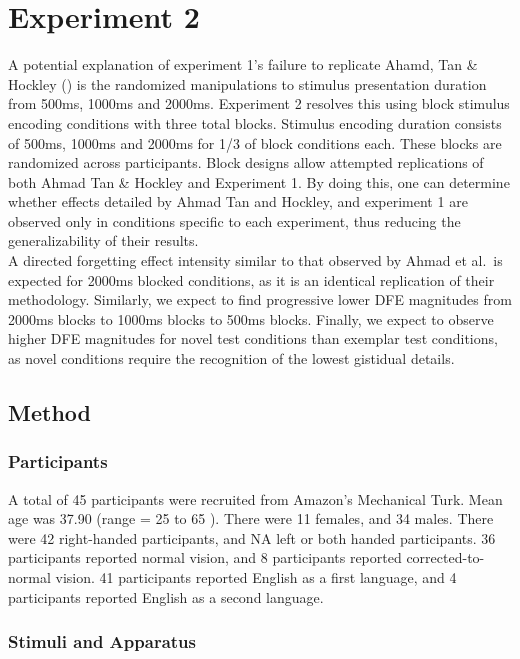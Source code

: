 \documentclass[
  english,
  man,floatsintext]{apa6}
\begin{document}
\hypertarget{experiment-2}{%
\section{Experiment 2}\label{experiment-2}}

A potential explanation of experiment 1's failure to replicate Ahamd, Tan \& Hockley () is the randomized manipulations to stimulus presentation duration from 500ms, 1000ms and 2000ms. Experiment 2 resolves this using block stimulus encoding conditions with three total blocks. Stimulus encoding duration consists of 500ms, 1000ms and 2000ms for 1/3 of block conditions each. These blocks are randomized across participants. Block designs allow attempted replications of both Ahmad Tan \& Hockley and Experiment 1. By doing this, one can determine whether effects detailed by Ahmad Tan and Hockley, and experiment 1 are observed only in conditions specific to each experiment, thus reducing the generalizability of their results.\\
A directed forgetting effect intensity similar to that observed by Ahmad et al.~is expected for 2000ms blocked conditions, as it is an identical replication of their methodology. Similarly, we expect to find progressive lower DFE magnitudes from 2000ms blocks to 1000ms blocks to 500ms blocks. Finally, we expect to observe higher DFE magnitudes for novel test conditions than exemplar test conditions, as novel conditions require the recognition of the lowest gistidual details.

\hypertarget{method-1}{%
\subsection{Method}\label{method-1}}

\hypertarget{participants-1}{%
\subsubsection{Participants}\label{participants-1}}

A total of 45 participants were recruited from Amazon's Mechanical Turk. Mean age was 37.90 (range = 25 to 65 ). There were 11 females, and 34 males. There were 42 right-handed participants, and NA left or both handed participants. 36 participants reported normal vision, and 8 participants reported corrected-to-normal vision. 41 participants reported English as a first language, and 4 participants reported English as a second language.

\hypertarget{stimuli-and-apparatus}{%
\subsubsection{Stimuli and Apparatus}\label{stimuli-and-apparatus}}
\end{document}
